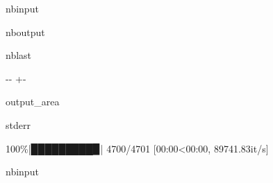 \documentclass[letterpaper,10pt,english]{sphinxmanual}
\begin{document}
\begin{sphinxuseclass}{nbinput}
{
\begin{sphinxVerbatim}[commandchars=\\\{\}]
\llap{\color{nbsphinxin}[8]:\,\hspace{\fboxrule}\hspace{\fboxsep}}    \PYG{p}{[}\PYG{p}{]}\PYG{p}{[}\PYG{p}{]} 
\end{sphinxVerbatim}
}

\end{sphinxuseclass}
\begin{sphinxuseclass}{nboutput}
\begin{sphinxuseclass}{nblast}
{

\kern-\sphinxverbatimsmallskipamount\kern-\baselineskip
\kern+\FrameHeightAdjust\kern-\fboxrule
\vspace{\nbsphinxcodecellspacing}

\begin{sphinxuseclass}{output_area}
\begin{sphinxuseclass}{stderr}


\begin{sphinxVerbatim}[commandchars=\\\{\}]
100\%|█████████▉| 4700/4701 [00:00<00:00, 89741.83it/s]
\end{sphinxVerbatim}



\end{sphinxuseclass}
\end{sphinxuseclass}
}

\end{sphinxuseclass}
\end{sphinxuseclass}
\begin{sphinxuseclass}{nbinput}
{
\begin{sphinxVerbatim}[commandchars=\\\{\}]
\llap{\color{nbsphinxin}[9]:\,\hspace{\fboxrule}\hspace{\fboxsep}}   
\end{sphinxVerbatim}
}

\end{sphinxuseclass}
\end{document}
